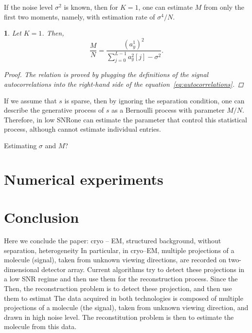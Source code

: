 \documentclass[english]{article}
\numberwithin{equation}{section}
\theoremstyle{plain}
\theoremstyle{definition}
\theoremstyle{remark}
\theoremstyle{plain}
\theoremstyle{remark}
\theoremstyle{plain}
\theoremstyle{plain}
\newtheorem{proposition}[thm]{\protect\propositionname}
\providecommand{\propositionname}{Proposition}
\newcommand{\SNR}{{\textsf{SNR}}}
\begin{document}
If the noise level $\sigma^2$ is known, then for $K=1$, one can estimate $M$ from only the first two moments, namely, with estimation rate of $\sigma^4/N$.
\begin{proposition}
	Let $K=1$. Then, 
	\begin{equation*}
	\frac{M}{N} = \frac{(a^1_y)^2}{\sum_{j=0}^{L-1}a_y^2[j]-\sigma^2}.
	\end{equation*}
	\begin{proof}
The relation is proved by plugging the definitions of the signal autocorrelations into the right-hand side of the equation~\eqref{eq:autocorrelations}. 	
\end{proof}
\end{proposition}

If we assume that $s$ is sparse, then by ignoring the separation condition, one can describe the generative process of $s$ as a Bernoulli process with parameter $M/N$. Therefore, in low \SNR  one can estimate the parameter that control this statistical process, although cannot estimate individual entries.

Estimating $\sigma$ and $M$? 


\section{Numerical experiments}   \label{sec:numerics}



\section{Conclusion} 
Here we conclude the paper: cryo -- EM, structured background, without separation, heterogeneity
In particular, in cryo--EM, multiple projections of a molecule (signal), taken
from unknown viewing directions, are recorded on two-dimensional detector
array. Current algorithms try to detect these projections in a low SNR regime
and then use them for the reconstruction process. Since the
Then, the reconstruction problem is to detect these projection, and then use
them to estimat
The data acquired in both technologies is composed of multiple projections
of a molecule (the signal), taken from unknown viewing direction, and drawn in
high noise level. The reconstitution problem is then to estimate the molecule
from this data.







\appendix
\end{document}
